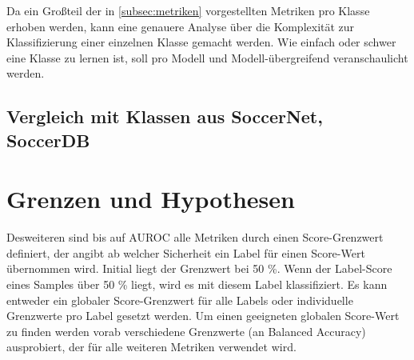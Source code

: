Da ein Großteil der in \autoref{subsec:metriken} vorgestellten Metriken pro Klasse erhoben werden, kann eine genauere Analyse über die Komplexität zur Klassifizierung einer einzelnen Klasse gemacht werden.
Wie einfach oder schwer eine Klasse zu lernen ist, soll pro Modell und Modell-übergreifend veranschaulicht werden.

\subsection*{Vergleich mit Klassen aus SoccerNet, SoccerDB}

\section{Grenzen und Hypothesen}

\begin{tcolorbox}[title=Todo]
    Desweiteren sind bis auf AUROC alle Metriken durch einen Score-Grenzwert definiert, der angibt ab welcher Sicherheit ein Label für einen Score-Wert übernommen wird.
    Initial liegt der Grenzwert bei 50 \%.
    Wenn der Label-Score eines Samples über 50 \% liegt, wird es \ua mit diesem Label klassifiziert.
    Es kann entweder ein globaler Score-Grenzwert für alle Labels oder individuelle Grenzwerte pro Label gesetzt werden.
    Um einen geeigneten globalen Score-Wert zu finden werden vorab verschiedene Grenzwerte (an Balanced Accuracy) ausprobiert, der für alle weiteren Metriken verwendet wird.
\end{tcolorbox}





